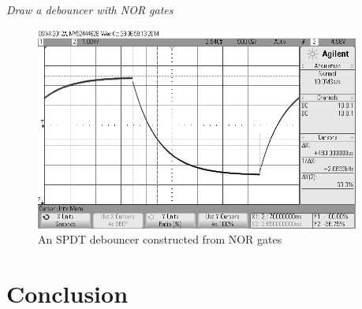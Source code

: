 \documentclass[11pt]{article}
\begin{document}
{\em Draw a debouncer with NOR gates}
\begin{figure}[h]
	\centering
	\includegraphics[width=0.95\textwidth, draft=true]{nor_gates}
	\caption{An SPDT debouncer constructed from NOR gates}
	\label{fig:nor_gates}
\end{figure}

\section{Conclusion}
\end{document}
